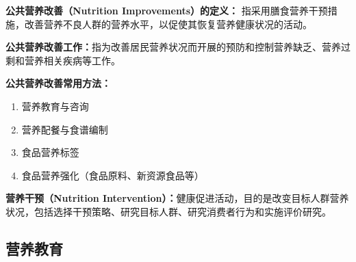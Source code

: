\begin{defbox}
\textbf{公共营养改善（Nutrition Improvements）的定义：}
指采用膳食营养干预措施，改善营养不良人群的营养水平，以促使其恢复营养健康状况的活动。

\textbf{公共营养改善工作：}指为改善居民营养状况而开展的预防和控制营养缺乏、营养过剩和营养相关疾病等工作。

\textbf{公共营养改善常用方法：}
\begin{enumerate}[leftmargin=*]
    \item 营养教育与咨询
    \item 营养配餐与食谱编制
    \item 食品营养标签
    \item 食品营养强化（食品原料、新资源食品等）
\end{enumerate}

\textbf{营养干预（Nutrition Intervention）：}健康促进活动，目的是改变目标人群营养状况，包括选择干预策略、研究目标人群、研究消费者行为和实施评价研究。
\end{defbox}

\subsection{营养教育}

